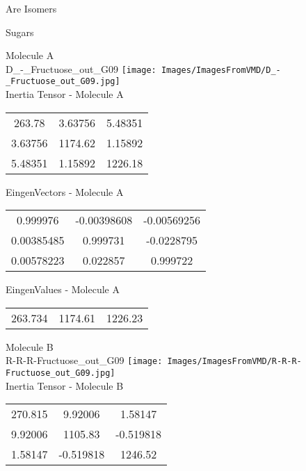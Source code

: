 \begin{center}
\vtab
\vtab
\textcolor{NavyBlue}{\Large Are Isomers}
\end{center}
\newpage

\vtab[-2cm]
\begin{center}
{\large Sugars}
\end{center}
\begin{multicols}{2}
\begin{center}
Molecule A \\ 
D\_-\_Fructuose\_out\_G09
\texttt{[image: Images/ImagesFromVMD/D\_-\_Fructuose\_out\_G09.jpg]}
\\
Inertia Tensor - Molecule A \\
\vtab
\begin{tabular}{|c c c|}
263.78	 & 	3.63756	 & 	5.48351	 \\
3.63756	 & 	1174.62	 & 	1.15892	 \\
5.48351	 & 	1.15892	 & 	1226.18
\end{tabular}

\vtab
 EingenVectors - Molecule A     \\
\vtab
\begin{tabular}{|c c c|}
0.999976	 & 	-0.00398608	 & 	-0.00569256	 \\
0.00385485	 & 	0.999731	 & 	-0.0228795	 \\
0.00578223	 & 	0.022857	 & 	0.999722
\end{tabular}

\vtab
 EingenValues - Molecule A     \\
\vtab
\begin{tabular}{|c c c|}
263.734	 & 	1174.61	 & 	1226.23
\end{tabular}
\columnbreak

Molecule B \\ 
R-R-R-Fructuose\_out\_G09
\texttt{[image: Images/ImagesFromVMD/R-R-R-Fructuose\_out\_G09.jpg]}
\\
Inertia Tensor - Molecule B \\
\vtab
\begin{tabular}{|c c c|}
270.815	 & 	9.92006	 & 	1.58147	 \\
9.92006	 & 	1105.83	 & 	-0.519818	 \\
1.58147	 & 	-0.519818	 & 	1246.52
\end{tabular}


\end{center}
\end{multicols}
